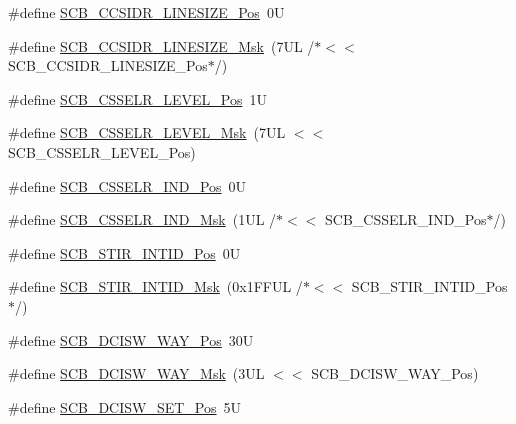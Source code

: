 \begin{DoxyCompactItemize}
\item 
\#define \hyperlink{group___c_m_s_i_s___s_c_b_ga750388e1509b36d35568a68a7a1e1ff7}{S\-C\-B\-\_\-\-C\-C\-S\-I\-D\-R\-\_\-\-L\-I\-N\-E\-S\-I\-Z\-E\-\_\-\-Pos}~0\-U
\item 
\#define \hyperlink{group___c_m_s_i_s___s_c_b_ga07b3bdffe4c289b9c19c70cf698499da}{S\-C\-B\-\_\-\-C\-C\-S\-I\-D\-R\-\_\-\-L\-I\-N\-E\-S\-I\-Z\-E\-\_\-\-Msk}~(7\-U\-L /$\ast$$<$$<$ S\-C\-B\-\_\-\-C\-C\-S\-I\-D\-R\-\_\-\-L\-I\-N\-E\-S\-I\-Z\-E\-\_\-\-Pos$\ast$/)
\item 
\#define \hyperlink{group___c_m_s_i_s___s_c_b_ga8c014c9678bc9072f10459a1e14b973c}{S\-C\-B\-\_\-\-C\-S\-S\-E\-L\-R\-\_\-\-L\-E\-V\-E\-L\-\_\-\-Pos}~1\-U
\item 
\#define \hyperlink{group___c_m_s_i_s___s_c_b_gaa24e3a6d6960acff3d6949e416046cf0}{S\-C\-B\-\_\-\-C\-S\-S\-E\-L\-R\-\_\-\-L\-E\-V\-E\-L\-\_\-\-Msk}~(7\-U\-L $<$$<$ S\-C\-B\-\_\-\-C\-S\-S\-E\-L\-R\-\_\-\-L\-E\-V\-E\-L\-\_\-\-Pos)
\item 
\#define \hyperlink{group___c_m_s_i_s___s_c_b_ga70e80783c3bd7b11504c63b052b0c0b9}{S\-C\-B\-\_\-\-C\-S\-S\-E\-L\-R\-\_\-\-I\-N\-D\-\_\-\-Pos}~0\-U
\item 
\#define \hyperlink{group___c_m_s_i_s___s_c_b_ga4e5d98f4d43366cadcc5c3d7ac37228c}{S\-C\-B\-\_\-\-C\-S\-S\-E\-L\-R\-\_\-\-I\-N\-D\-\_\-\-Msk}~(1\-U\-L /$\ast$$<$$<$ S\-C\-B\-\_\-\-C\-S\-S\-E\-L\-R\-\_\-\-I\-N\-D\-\_\-\-Pos$\ast$/)
\item 
\#define \hyperlink{group___c_m_s_i_s___s_c_b_gaeb4a916d84d967c1bab8e88800a28984}{S\-C\-B\-\_\-\-S\-T\-I\-R\-\_\-\-I\-N\-T\-I\-D\-\_\-\-Pos}~0\-U
\item 
\#define \hyperlink{group___c_m_s_i_s___s_c_b_ga7b67f900eb9c63b04e67f8fa6ddcd8ed}{S\-C\-B\-\_\-\-S\-T\-I\-R\-\_\-\-I\-N\-T\-I\-D\-\_\-\-Msk}~(0x1\-F\-F\-U\-L /$\ast$$<$$<$ S\-C\-B\-\_\-\-S\-T\-I\-R\-\_\-\-I\-N\-T\-I\-D\-\_\-\-Pos$\ast$/)
\item 
\#define \hyperlink{group___c_m_s_i_s___s_c_b_gaa6a2a5e1707c9ef277e67dacd4e247fd}{S\-C\-B\-\_\-\-D\-C\-I\-S\-W\-\_\-\-W\-A\-Y\-\_\-\-Pos}~30\-U
\item 
\#define \hyperlink{group___c_m_s_i_s___s_c_b_gabfe6096a36807e0b7e1d09a06ef1d750}{S\-C\-B\-\_\-\-D\-C\-I\-S\-W\-\_\-\-W\-A\-Y\-\_\-\-Msk}~(3\-U\-L $<$$<$ S\-C\-B\-\_\-\-D\-C\-I\-S\-W\-\_\-\-W\-A\-Y\-\_\-\-Pos)
\item 
\#define \hyperlink{group___c_m_s_i_s___s_c_b_gaea6bd5b7d1c47c7db06afdecc6e49281}{S\-C\-B\-\_\-\-D\-C\-I\-S\-W\-\_\-\-S\-E\-T\-\_\-\-Pos}~5\-U
\item 

\end{DoxyCompactItemize}
